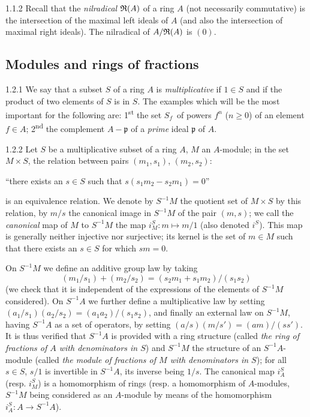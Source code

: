 \begin{env}{1.1.2}
\label{env-0.1.1.2}
Recall that the \emph{nilradical} $\mathfrak{R}(A)$ of a ring $A$ (not necessarily commutative) is
the intersection of the maximal left ideals of $A$ (and also the intersection of maximal
right ideals). The nilradical of $A/\mathfrak{R}(A)$ is $(0)$.
\end{env}

\subsection{Modules and rings of fractions}
\label{0-prelim-1.2}

\begin{env}{1.2.1}
\label{env-0.1.2.1}
We say that a subset $S$ of a ring $A$ is \emph{multiplicative} if $1\in S$ and if the
product of two elements of $S$ is in $S$. The examples which will be the most important for
the following are: 1\textsuperscript{st} the set $S_f$ of powers $f^n$ ($n\geqslant 0$) of an
element $f\in A$; 2\textsuperscript{nd} the complement $A-\mathfrak{p}$ of a \emph{prime}
ideal $\mathfrak{p}$ of $A$.
\end{env}

\begin{env}{1.2.2}
\label{env-0.1.2.2}
Let $S$ be a multiplicative subset of a ring $A$, $M$ an $A$-module; in the set $M\times S$,
the relation between pairs $(m_1,s_1)$, $(m_2,s_2)$:
\begin{center}
   ``there exists an $s\in S$ such that $s(s_1 m_2-s_2 m_1)=0$''
\end{center}
is an equivalence relation. We denote by $S^{-1}M$ the quotient set of $M\times S$ by this
relation, by $m/s$ the canonical image in $S^{-1}M$ of the pair $(m,s)$; we call the
\emph{canonical} map of $M$ to $S^{-1}M$ the map $i_M^S:m\mapsto m/1$ (also denoted $i^S$).
This map is generally neither injective nor surjective; its kernel is the set of $m\in M$
such that there exists an $s\in S$ for which $sm=0$.

On $S^{-1}M$ we define an additive group law by taking
\[
  (m_1/s_1)+(m_2/s_2)=(s_2 m_1+s_1 m_2)/(s_1 s_2)
\]
(we check that it is independent of the expressions of the elements of $S^{-1}M$ considered).
On $S^{-1}A$ we further define a multiplicative law by setting
$(a_1/s_1)(a_2/s_2)=(a_1 a_2)/(s_1 s_2)$, and finally an external law on $S^{-1}M$, having
$S^{-1}A$ as a set of operators, by setting $(a/s)(m/s')=(am)/(ss')$. It is thus verified
that $S^{-1}A$ is provided with a ring structure (called \emph{the ring of fractions of $A$
with denominators in $S$}) and $S^{-1}M$ the structure of an $S^{-1}A$-module (called
\emph{the  module of fractions of $M$ with denominators in $S$}); for all $s\in S$, $s/1$ is
invertible in $S^{-1}A$, its inverse being $1/s$. The canonical map $i_A^S$ (resp. $i_M^S$)
is a homomorphism of rings (resp. a homomorphism of $A$-modules, $S^{-1}M$ being considered
as an $A$-module by means of the homomorphism $i_A^S:A\to S^{-1}A$).
\end{env}

